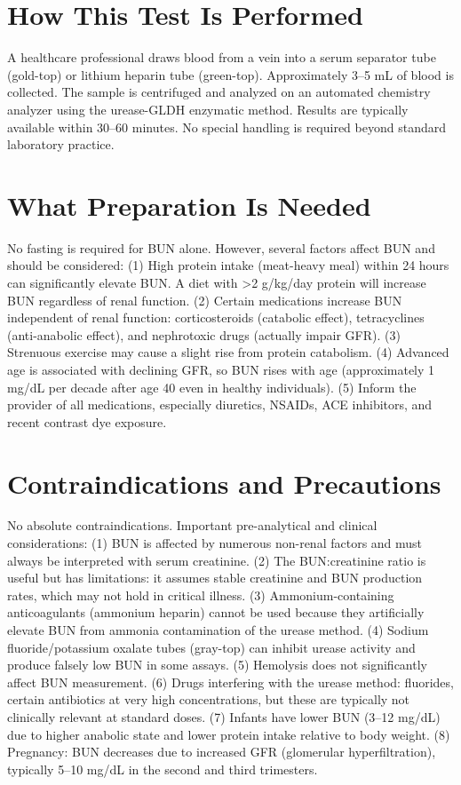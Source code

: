 \section*{How This Test Is Performed}
A healthcare professional draws blood from a vein into a serum separator tube (gold-top) or lithium heparin tube (green-top). Approximately 3--5 mL of blood is collected. The sample is centrifuged and analyzed on an automated chemistry analyzer using the urease-GLDH enzymatic method. Results are typically available within 30--60 minutes. No special handling is required beyond standard laboratory practice.

\section*{What Preparation Is Needed}
No fasting is required for BUN alone. However, several factors affect BUN and should be considered: (1) High protein intake (meat-heavy meal) within 24 hours can significantly elevate BUN. A diet with >2 g/kg/day protein will increase BUN regardless of renal function. (2) Certain medications increase BUN independent of renal function: corticosteroids (catabolic effect), tetracyclines (anti-anabolic effect), and nephrotoxic drugs (actually impair GFR). (3) Strenuous exercise may cause a slight rise from protein catabolism. (4) Advanced age is associated with declining GFR, so BUN rises with age (approximately 1 mg/dL per decade after age 40 even in healthy individuals). (5) Inform the provider of all medications, especially diuretics, NSAIDs, ACE inhibitors, and recent contrast dye exposure.

\section*{Contraindications and Precautions}
No absolute contraindications. Important pre-analytical and clinical considerations: (1) BUN is affected by numerous non-renal factors and must always be interpreted with serum creatinine. (2) The BUN:creatinine ratio is useful but has limitations: it assumes stable creatinine and BUN production rates, which may not hold in critical illness. (3) Ammonium-containing anticoagulants (ammonium heparin) cannot be used because they artificially elevate BUN from ammonia contamination of the urease method. (4) Sodium fluoride/potassium oxalate tubes (gray-top) can inhibit urease activity and produce falsely low BUN in some assays. (5) Hemolysis does not significantly affect BUN measurement. (6) Drugs interfering with the urease method: fluorides, certain antibiotics at very high concentrations, but these are typically not clinically relevant at standard doses. (7) Infants have lower BUN (3--12 mg/dL) due to higher anabolic state and lower protein intake relative to body weight. (8) Pregnancy: BUN decreases due to increased GFR (glomerular hyperfiltration), typically 5--10 mg/dL in the second and third trimesters.

